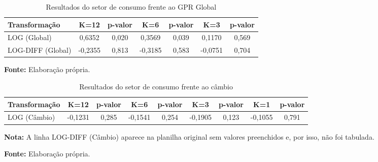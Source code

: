 \begin{table}[H]
\centering
\caption{Resultados do setor de consumo frente ao GPR Global}
\label{tab:consumo-gpr-global}
\small
\begin{adjustbox}{max width=\textwidth}
\begin{tabular}{@{}lcccccc@{}}
\toprule
Transformação & K=12 & p-valor & K=6 & p-valor & K=3 & p-valor \\
\midrule
LOG (Global) & 0,6352 & 0,020 & 0,3569 & 0,039 & 0,1170 & 0,569 \\
LOG-DIFF (Global) & -0,2355 & 0,813 & -0,3185 & 0,583 & -0,0751 & 0,704 \\
\bottomrule
\end{tabular}
\end{adjustbox}
\vspace{1mm}
\begin{minipage}{\textwidth}
\footnotesize
\textbf{Fonte:} Elaboração própria.
\end{minipage}
\end{table}

\begin{table}[H]
\centering
\caption{Resultados do setor de consumo frente ao câmbio}
\label{tab:consumo-cambio}
\small
\begin{adjustbox}{max width=\textwidth}
\begin{tabular}{@{}lcccccccc@{}}
\toprule
Transformação & K=12 & p-valor & K=6 & p-valor & K=3 & p-valor & K=1 & p-valor \\
\midrule
LOG (Câmbio) & -0,1231 & 0,285 & -0,1541 & 0,254 & -0,1905 & 0,123 & -0,1055 & 0,791 \\
\bottomrule
\end{tabular}
\end{adjustbox}
\vspace{1mm}
\begin{minipage}{\textwidth}
\footnotesize
\textbf{Nota:} A linha LOG-DIFF (Câmbio) aparece na planilha original sem valores preenchidos e, por isso, não foi tabulada.\par
\textbf{Fonte:} Elaboração própria.
\end{minipage}
\end{table}

